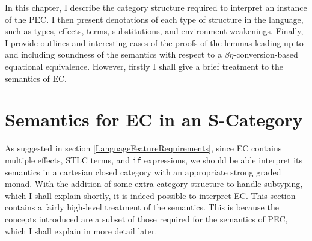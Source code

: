 \documentclass{Report}
\begin{document}
 
    

In this chapter, I  describe the category structure required to interpret an instance of the PEC. I then present denotations of each type of structure in the language, such as types, effects, terms, substitutions, and environment weakenings. Finally, I provide outlines and interesting cases of the proofs of the lemmas leading up to and including soundness of the semantics with respect to a $\beta\eta$-conversion-based equational equivalence. However, firstly I shall give a brief treatment to the semantics of EC.


\section{Semantics for EC in an S-Category}\label{SCategoryIntro}

As suggested in section \ref{LanguageFeatureRequirements}, since EC contains multiple effects, STLC terms, and \texttt{if} expressions, we should be able interpret its semantics in a cartesian closed category with an appropriate strong graded monad. With the addition of some extra category structure to handle subtyping, which I shall explain shortly, it is indeed possible to interpret EC. This section contains a fairly high-level treatment of the semantics. This is because the concepts introduced are a subset of those required for the semantics of PEC, which I shall explain in more detail later.

\end{document}

